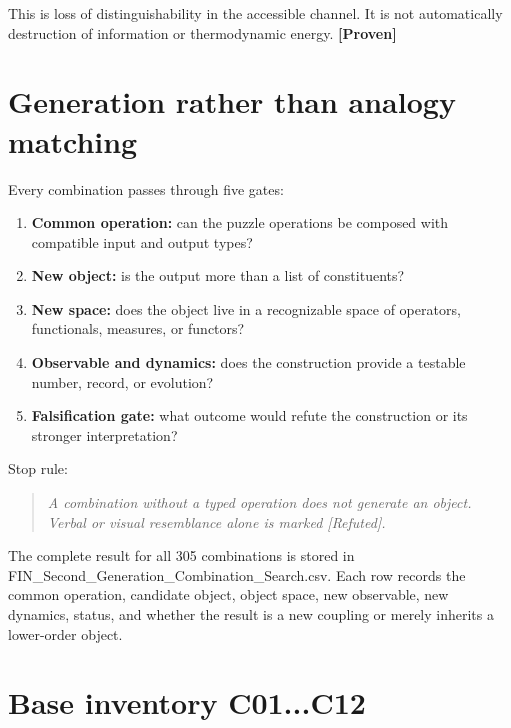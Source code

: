 \documentclass[11pt,a4paper,openany]{report}
\newcommand{\statusProven}{\textcolor{fingreen}{[Proven]}}
\newcommand{\statusRefuted}{\textcolor{finred}{[Refuted]}}
\begin{document}
This is loss of distinguishability in the accessible channel. It is not automatically destruction of information or thermodynamic energy. \textbf{\statusProven{}}

\chapter{Generation rather than analogy matching}

Every combination passes through five gates:

\begin{enumerate}
\item 
\textbf{Common operation:} can the puzzle operations be composed with compatible input and output types?

\item 
\textbf{New object:} is the output more than a list of constituents?

\item 
\textbf{New space:} does the object live in a recognizable space of operators, functionals, measures, or functors?

\item 
\textbf{Observable and dynamics:} does the construction provide a testable number, record, or evolution?

\item 
\textbf{Falsification gate:} what outcome would refute the construction or its stronger interpretation?

\end{enumerate}

Stop rule:

\begin{quote}\itshape
A combination without a typed operation does not generate an object. Verbal or visual resemblance alone is marked \statusRefuted{}.

\end{quote}

The complete result for all 305 combinations is stored in FIN\_Second\_Generation\_Combination\_Search.csv. Each row records the common operation, candidate object, object space, new observable, new dynamics, status, and whether the result is a new coupling or merely inherits a lower-order object.

\chapter{Base inventory C01...C12}
\end{document}
